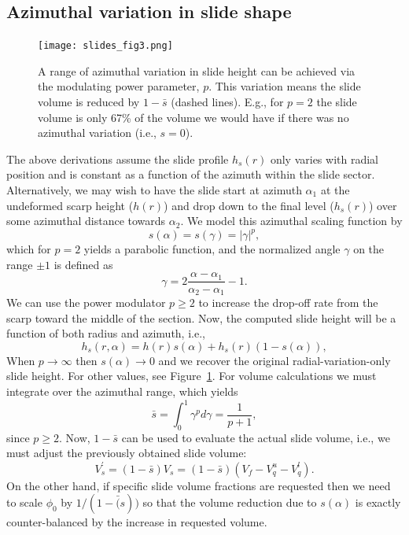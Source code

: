 \documentclass[12pt,letterpaper,margin=0.5in]{report}
\begin{document}
\subsection{Azimuthal variation in slide shape}

\begin{figure}[h!]
  \centering
  \texttt{[image: slides\_fig3.png]}
  \caption{A range of azimuthal variation in slide height can be achieved via the modulating power parameter, $p$. This variation
  means the slide volume is reduced by $1 - \bar{s}$ (dashed lines). E.g., for $p = 2$ the slide volume is only 67\% of the
  volume we would have if there was no azimuthal variation (i.e., $s = 0$).}
  \label{slides_fig3}
\end{figure}

The above derivations assume the slide profile $h_s(r)$ only varies with radial position and is constant as a function of the azimuth within the slide sector.
Alternatively, we may wish to have the slide start at azimuth $\alpha_1$ at the undeformed scarp height ($h(r)$) and drop down to the final level ($h_s(r)$)
over some azimuthal distance towards $\alpha_2$.  We model this azimuthal scaling function by
\begin{equation}
s(\alpha) = s(\gamma) = \left |\gamma\right|^p,
\end{equation}
which for $p = 2$ yields a parabolic function, and the normalized angle $\gamma$ on the range $\pm1$ is defined as
\begin{equation}
\gamma = 2\frac{\alpha - \alpha_1}{\alpha_2 - \alpha_1} - 1.
\end{equation}
We can use the power modulator $p \ge 2$ to increase the drop-off rate from the scarp toward the middle of the section. Now, the computed slide height will be a function
of both radius and azimuth, i.e.,
\begin{equation}
h_s(r, \alpha) = h(r) s(\alpha) + h_s(r) (1 - s(\alpha)),
\end{equation}
When $p \rightarrow \infty$ then $s(\alpha) \rightarrow 0$ and we recover the original radial-variation-only slide height. For other values,
see Figure~\ref{slides_fig3}.
For volume calculations we must integrate over the azimuthal range, which yields
\begin{equation}
\bar{s} = \int_0^1  \gamma^p d\gamma = \frac{1}{p+1},
\end{equation}
since $p \ge 2$. Now, $1 - \bar{s}$ can be used to evaluate the actual slide volume, i.e., we must adjust the previously obtained slide volume:
\begin{equation}
V_s^' = (1 - \bar{s}) V_s = (1 - \bar{s}) \left (V_f - V^u_q - V^l_q \right).
\end{equation}
On the other hand, if specific slide volume fractions are requested then we need to scale $\phi_0$ by $1/(1 - \bar(s))$ so that the
volume reduction due to $s(\alpha)$ is exactly counter-balanced by the increase in requested volume.
\end{document}
